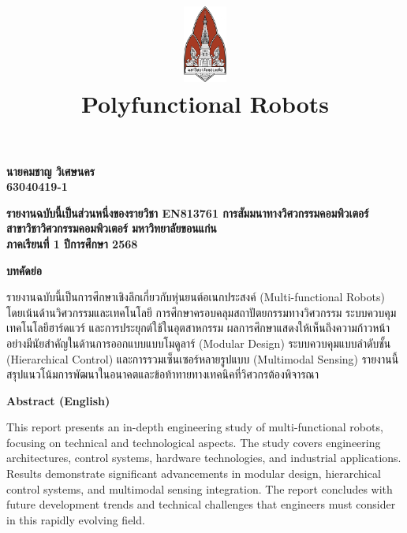 \documentclass[a4paper]{article}
\date{}
\author{}
\title{
    \includegraphics[width=1in, height=1in, keepaspectratio]{logo.png}
    \\[2ex]
    {\fontsize{32pt}{36pt}\selectfont\textbf{Polyfunctional Robots}}
}
\begin{document}
\maketitle
\thispagestyle{empty}

\vfill
\begin{center}
    {\fontsize{22pt}{26pt}\selectfont\textbf{
        นายคมชาญ วิเศษนคร
        \\ 63040419-1
    }}
\end{center}
\vfill

\vfill
\begin{center}
    {\fontsize{16pt}{20pt}\selectfont\textbf{
        รายงานฉบับนี้เป็นส่วนหนึ่งของรายวิชา EN813761 การสัมมนาทางวิศวกรรมคอมพิวเตอร์
        \\ สาขาวิชาวิศวกรรมคอมพิวเตอร์ มหาวิทยาลัยขอนแก่น
        \\ ภาคเรียนที่ 1 ปีการศึกษา 2568
    }}
\end{center}

\newpage

\setcounter{page}{1}

\noindent
{\centering
    {\fontsize{18pt}{22pt}\selectfont\textbf{บทคัดย่อ}\par}
}

รายงานฉบับนี้เป็นการศึกษาเชิงลึกเกี่ยวกับหุ่นยนต์อเนกประสงค์ (Multi-functional Robots) โดยเน้นด้านวิศวกรรมและเทคโนโลยี การศึกษาครอบคลุมสถาปัตยกรรมทางวิศวกรรม ระบบควบคุม เทคโนโลยีฮาร์ดแวร์ และการประยุกต์ใช้ในอุตสาหกรรม ผลการศึกษาแสดงให้เห็นถึงความก้าวหน้าอย่างมีนัยสำคัญในด้านการออกแบบแบบโมดูลาร์ (Modular Design) ระบบควบคุมแบบลำดับชั้น (Hierarchical Control) และการรวมเซ็นเซอร์หลายรูปแบบ (Multimodal Sensing) รายงานนี้สรุปแนวโน้มการพัฒนาในอนาคตและข้อท้าทายทางเทคนิคที่วิศวกรต้องพิจารณา

\vspace{1em}

\noindent
{\centering
    {\fontsize{18pt}{22pt}\selectfont\textbf{Abstract (English)}\par}
}

This report presents an in-depth engineering study of multi-functional robots, focusing on technical and technological aspects. The study covers engineering architectures, control systems, hardware technologies, and industrial applications. Results demonstrate significant advancements in modular design, hierarchical control systems, and multimodal sensing integration. The report concludes with future development trends and technical challenges that engineers must consider in this rapidly evolving field.
\end{document}
